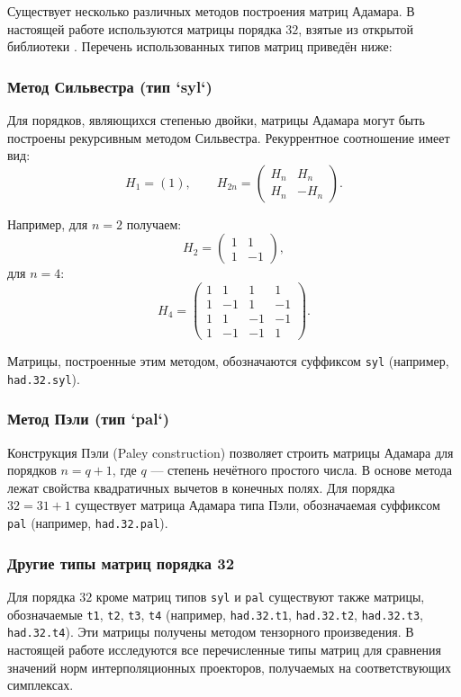 \documentclass[a4paper,12pt]{article}
\theoremstyle{indented}
\begin{document}
Существует несколько различных методов построения матриц Адамара. В настоящей работе используются матрицы порядка $32$, взятые из открытой библиотеки \cite{sloane_hadamard}. Перечень использованных типов матриц приведён ниже:

\subsubsection{Метод Сильвестра (тип `syl`)}

Для порядков, являющихся степенью двойки, матрицы Адамара могут быть построены рекурсивным методом Сильвестра. Рекуррентное соотношение имеет вид:
\[
H_{1} = (1), \qquad H_{2n} = \begin{pmatrix}
H_n & H_n \\
H_n & -H_n
\end{pmatrix}.
\]

Например, для $n = 2$ получаем:
\[
H_2 = \begin{pmatrix}
1 & 1 \\
1 & -1
\end{pmatrix},
\]
для $n = 4$:
\[
H_4 = \begin{pmatrix}
1 & 1 & 1 & 1 \\
1 & -1 & 1 & -1 \\
1 & 1 & -1 & -1 \\
1 & -1 & -1 & 1
\end{pmatrix}.
\]

Матрицы, построенные этим методом, обозначаются суффиксом \texttt{syl} (например, \texttt{had.32.syl}).

\subsubsection{Метод Пэли (тип `pal`)}

Конструкция Пэли (Paley construction) позволяет строить матрицы Адамара для порядков $n = q + 1$, где $q$ — степень нечётного простого числа. В основе метода лежат свойства квадратичных вычетов в конечных полях. Для порядка $32 = 31 + 1$ существует матрица Адамара типа Пэли, обозначаемая суффиксом \texttt{pal} (например, \texttt{had.32.pal}).

\subsubsection{Другие типы матриц порядка 32}

Для порядка $32$ кроме матриц типов \texttt{syl} и \texttt{pal} существуют также матрицы, обозначаемые \texttt{t1}, \texttt{t2}, \texttt{t3}, \texttt{t4} (например, \texttt{had.32.t1}, \texttt{had.32.t2}, \texttt{had.32.t3}, \texttt{had.32.t4}). Эти матрицы получены методом тензорного произведения. В настоящей работе исследуются все перечисленные типы матриц для сравнения значений норм интерполяционных проекторов, получаемых на соответствующих симплексах.
\end{document}

